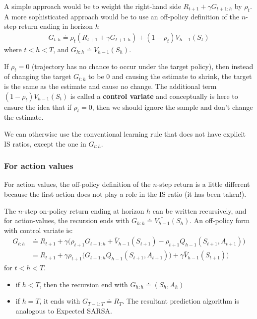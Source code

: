 \documentclass[sutton_barto_notes.tex]{subfiles}
\begin{document}
A simple approach would be to weight the right-hand side $R_{t+1}+\gamma G_{t+1:h}$ by $\rho_t$. A more sophisticated approach would be to use an off-policy definition of the $n$-step return ending in horizon $h$
\begin{align}
G_{t:h} \doteq \rho_t(R_{t+1} + \gamma G_{t+1:h}) + (1 - \rho_t) V_{h-1}(S_t) \label{eq:7.11}\tag{7.11}
\end{align}
where $t < h < T$, and $G_{h:h} \doteq V_{h-1} (S_h)$.

If $\rho_t = 0$ (trajectory has no chance to occur under the target policy), then instead of changing the target $G_{t:h}$ to be 0 and causing the estimate to shrink, the target is the same as the estimate and cause no change. The additional term $(1 - \rho_t) V_{h-1}(S_t)$ is called a \textbf{control variate} and conceptually is here to ensure the idea that if $\rho_t = 0$, then we should ignore the sample and don't change the estimate.

We can otherwise use the conventional learning rule that does not have explicit IS ratios, except the one in $G_{t:h}$.

\subsubsection{For action values}

For action values, the off-policy definition of the $n$-step return is a little different because the first action does not play a role in the IS ratio (it has been taken!).

The $n$-step on-policy return ending at horizon $h$ can be written recursively, and for action-values, the recursion ends with $G_{h:h}\doteq \bar{V_{h-1}}(S_h)$. An off-policy form with control variate is:
\begin{align}
G_{t:h} & \doteq R_{t+1} + \gamma \big(\rho_{t+1} G_{t+1:h} + \bar{V}_{h-1}(S_{t+1}) - \rho_{t+1} Q_{h-1}(S_{t+1}, A_{t+1}) \big) \label{eq:7.12}\tag{7.12}\\
 & = R_{t+1} + \gamma \rho_{t+1}\big(G_{t+1:h} Q_{h-1}(S_{t+1}, A_{t+1}) \big) + \gamma \bar{V}_{h-1}(S_{t+1}) \big)\label{eq:7.13}\tag{7.13}
\end{align}
for $t < h < T$.
\begin{itemize}
\item if $h < T$, then the recursion end with $G_{h:h} \doteq (S_h, A_h)$
\item if $h = T$, it ends with $G_{T-1:T} \doteq R_T$. The resultant prediction algorithm is analogous to Expected SARSA.
\end{itemize}
\end{document}
